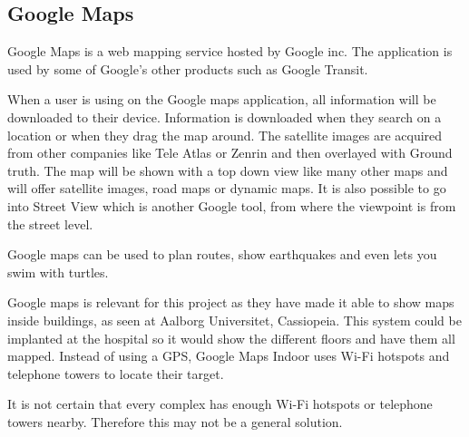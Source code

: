 \subsection{Google Maps}
Google Maps is a web mapping service hosted by Google inc. The application is used by some of Google's other products such as Google Transit\cite{Goo_transist}. 

When a user is using on the Google maps application, all information will be downloaded to their device. Information is downloaded when they search on a location or when they drag the map around\cite{Goo_input}. The satellite images are acquired from other companies like Tele Atlas\cite{Goo_Tele} or Zenrin\cite{Goo_Zenrin} and then overlayed with Ground truth\cite{Goo_GT}.
The map will be shown with a top down view like many other maps and will offer satellite images, road maps or dynamic maps. It is also possible to go into Street View which is another Google tool, from where the viewpoint is from the street level\cite{Goo_street}.

Google maps can be used to plan routes, show earthquakes and even lets you swim with turtles\cite{Goo_Turtle}.

Google maps is relevant for this project as they have made it able to show maps inside buildings, as seen at Aalborg Universitet, Cassiopeia\cite{Goo_Indoor}. This system could be implanted at the hospital so it would show the different floors and have them all mapped. Instead of using a GPS, Google Maps Indoor uses Wi-Fi hotspots and telephone towers to locate their target\cite{Goo_Indoor}.

It is not certain that every complex has enough Wi-Fi hotspots or telephone towers nearby. Therefore this may not be a general solution.